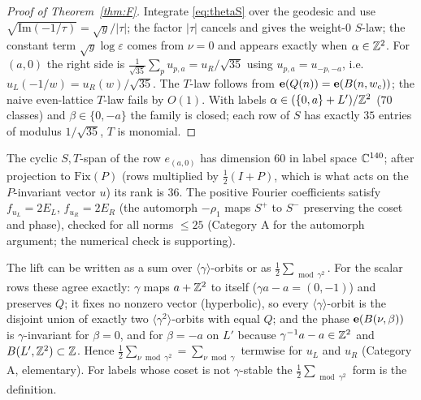 \begin{proof}[Proof of Theorem~\ref{thm:F}]
Integrate \eqref{eq:thetaS} over the geodesic and use $\sqrt{\mathrm{Im}(-1/\tau)}=\sqrt y/|\tau|$; the factor $|\tau|$ cancels and gives the
weight-$0$ $S$-law; the constant term $\sqrt y\log\varepsilon$ comes from $\nu=0$ and appears exactly when $\alpha\in\mathbb{Z}^2$. For $(a,0)$ the right
side is $\tfrac1{\sqrt{35}}\sum_pu_{p,a}=u_R/\sqrt{35}$ using $u_{p,a}=u_{-p,-a}$, i.e.\ $u_L(-1/w)=u_R(w)/\sqrt{35}$. The $T$-law follows from
$\mathbf{e}(Q(n))=\mathbf{e}(B(n,w_c))$; the naive even-lattice $T$-law fails by $O(1)$. With labels $\alpha\in(\{0,a\}+L')/\mathbb{Z}^2$ ($70$ classes) and
$\beta\in\{0,-a\}$ the family is closed; each row of $S$ has exactly $35$ entries of modulus $1/\sqrt{35}$, $T$ is monomial.
\end{proof}

\begin{remark}
The cyclic $S,T$-span of the row $e_{(a,0)}$ has dimension $60$ in label space $\mathbb{C}^{140}$; after projection to $\mathrm{Fix}(P)$ (rows multiplied by
$\tfrac12(I+P)$, which is what acts on the $P$-invariant vector $u$) its rank is $36$. The positive Fourier coefficients satisfy $f_{u_L}=2E_L$,
$f_{u_R}=2E_R$ (the automorph $-\rho_1$ maps $S^+$ to $S^-$ preserving the coset and phase), checked for all norms $\le25$ (Category A for the
automorph argument; the numerical check is supporting).
\end{remark}

\begin{remark}\label{rem:norm}
The lift can be written as a sum over $\langle\gamma\rangle$-orbits or as $\tfrac12\sum_{\bmod\gamma^2}$.
For the scalar rows these agree exactly: $\gamma$ maps $a+\mathbb{Z}^2$ to itself ($\gamma a-a=(0,-1)$) and preserves $Q$; it fixes no nonzero vector
(hyperbolic), so every $\langle\gamma\rangle$-orbit is the disjoint union of exactly two $\langle\gamma^2\rangle$-orbits with equal $Q$; and the
phase $\mathbf{e}(B(\nu,\beta))$ is $\gamma$-invariant for $\beta=0$, and for $\beta=-a$ on $L'$ because $\gamma^{-1}a-a\in\mathbb{Z}^2$ and $B(L',\mathbb{Z}^2)\subset\mathbb{Z}$.
Hence $\tfrac12\sum_{\nu\bmod\gamma^2}=\sum_{\nu\bmod\gamma}$ termwise for $u_L$ and $u_R$ (Category A, elementary). For labels whose coset is
not $\gamma$-stable the $\tfrac12\sum_{\bmod\gamma^2}$ form is the definition.
\end{remark}

